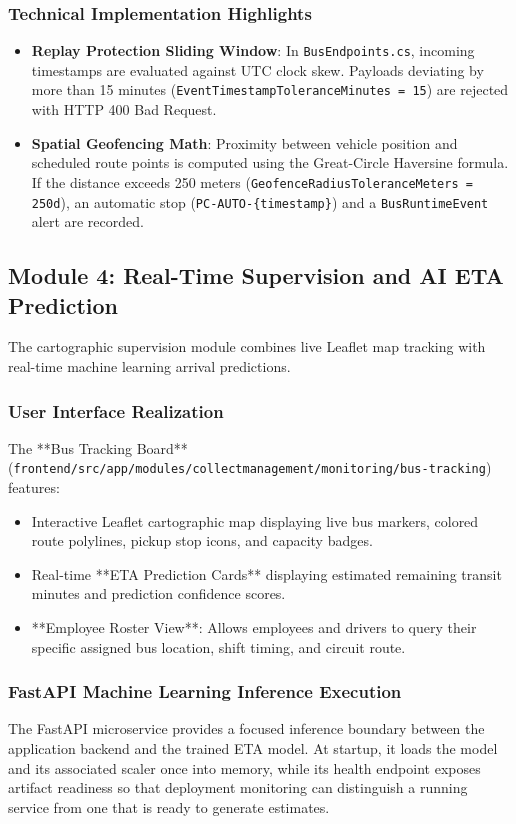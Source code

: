 \subsubsection{Technical Implementation Highlights}
\begin{itemize}
  \item \textbf{Replay Protection Sliding Window}: In \texttt{BusEndpoints.cs}, incoming timestamps are evaluated against UTC clock skew. Payloads deviating by more than 15 minutes (\texttt{EventTimestampToleranceMinutes = 15}) are rejected with HTTP 400 Bad Request.
  \item \textbf{Spatial Geofencing Math}: Proximity between vehicle position and scheduled route points is computed using the Great-Circle Haversine formula. If the distance exceeds 250 meters (\texttt{GeofenceRadiusToleranceMeters = 250d}), an automatic stop (\texttt{PC-AUTO-\{timestamp\}}) and a \texttt{BusRuntimeEvent} alert are recorded.
\end{itemize}

\subsection{Module 4: Real-Time Supervision and AI ETA Prediction}
\label{sec:impl_supervision_eta}

The cartographic supervision module combines live Leaflet map tracking with real-time machine learning arrival predictions.

\subsubsection{User Interface Realization}
The **Bus Tracking Board** (\texttt{frontend/src/app/modules/collectmanagement/monitoring/bus-tracking}) features:
\begin{itemize}
  \item Interactive Leaflet cartographic map displaying live bus markers, colored route polylines, pickup stop icons, and capacity badges.
  \item Real-time **ETA Prediction Cards** displaying estimated remaining transit minutes and prediction confidence scores.
  \item **Employee Roster View**: Allows employees and drivers to query their specific assigned bus location, shift timing, and circuit route.
\end{itemize}

\subsubsection{FastAPI Machine Learning Inference Execution}
The FastAPI microservice provides a focused inference boundary between the application backend and the trained ETA model. At startup, it loads the model and its associated scaler once into memory, while its health endpoint exposes artifact readiness so that deployment monitoring can distinguish a running service from one that is ready to generate estimates.

